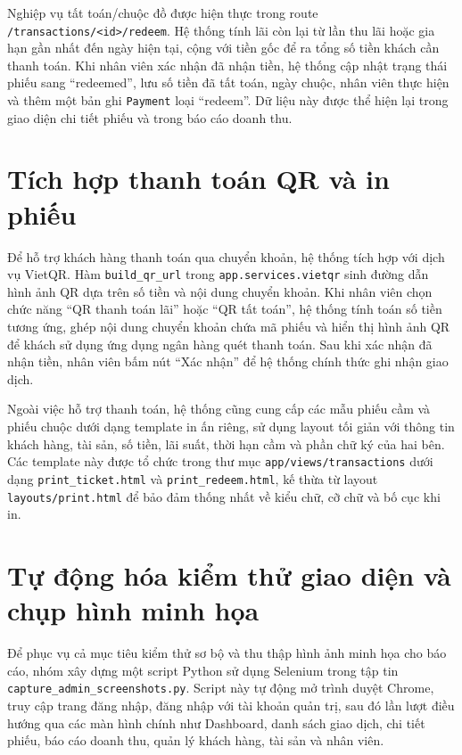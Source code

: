 \documentclass[13pt,a4paper]{extreport}
\begin{document}
Nghiệp vụ tất toán/chuộc đồ được hiện thực trong route \texttt{/transactions/\textless id\textgreater/redeem}. Hệ thống tính lãi còn lại từ lần thu lãi hoặc gia hạn gần nhất đến ngày hiện tại, cộng với tiền gốc để ra tổng số tiền khách cần thanh toán. Khi nhân viên xác nhận đã nhận tiền, hệ thống cập nhật trạng thái phiếu sang ``redeemed'', lưu số tiền đã tất toán, ngày chuộc, nhân viên thực hiện và thêm một bản ghi \texttt{Payment} loại ``redeem''. Dữ liệu này được thể hiện lại trong giao diện chi tiết phiếu và trong báo cáo doanh thu.

\section{Tích hợp thanh toán QR và in phiếu}

Để hỗ trợ khách hàng thanh toán qua chuyển khoản, hệ thống tích hợp với dịch vụ VietQR. Hàm \texttt{build\_qr\_url} trong \texttt{app.services.vietqr} sinh đường dẫn hình ảnh QR dựa trên số tiền và nội dung chuyển khoản. Khi nhân viên chọn chức năng ``QR thanh toán lãi'' hoặc ``QR tất toán'', hệ thống tính toán số tiền tương ứng, ghép nội dung chuyển khoản chứa mã phiếu và hiển thị hình ảnh QR để khách sử dụng ứng dụng ngân hàng quét thanh toán. Sau khi xác nhận đã nhận tiền, nhân viên bấm nút ``Xác nhận'' để hệ thống chính thức ghi nhận giao dịch.

Ngoài việc hỗ trợ thanh toán, hệ thống cũng cung cấp các mẫu phiếu cầm và phiếu chuộc dưới dạng template in ấn riêng, sử dụng layout tối giản với thông tin khách hàng, tài sản, số tiền, lãi suất, thời hạn cầm và phần chữ ký của hai bên. Các template này được tổ chức trong thư mục \texttt{app/views/transactions} dưới dạng \texttt{print\_ticket.html} và \texttt{print\_redeem.html}, kế thừa từ layout \texttt{layouts/print.html} để bảo đảm thống nhất về kiểu chữ, cỡ chữ và bố cục khi in.

\section{Tự động hóa kiểm thử giao diện và chụp hình minh họa}

Để phục vụ cả mục tiêu kiểm thử sơ bộ và thu thập hình ảnh minh họa cho báo cáo, nhóm xây dựng một script Python sử dụng Selenium trong tập tin \texttt{capture\_admin\_screenshots.py}. Script này tự động mở trình duyệt Chrome, truy cập trang đăng nhập, đăng nhập với tài khoản quản trị, sau đó lần lượt điều hướng qua các màn hình chính như Dashboard, danh sách giao dịch, chi tiết phiếu, báo cáo doanh thu, quản lý khách hàng, tài sản và nhân viên.
\end{document}
